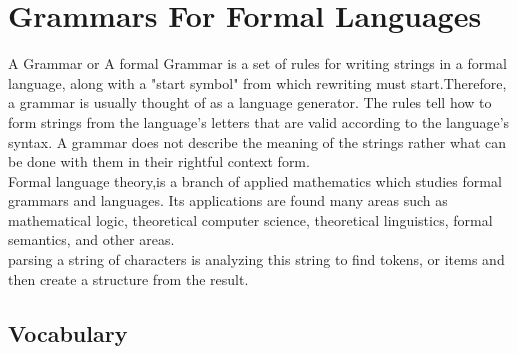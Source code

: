
\section{Grammars For Formal Languages}

A Grammar or A formal Grammar is a set of rules for writing strings in a formal language, along with a "start symbol" from which rewriting must start.Therefore, a grammar is usually thought of as a language generator. The rules tell how to form strings from the language's letters that are valid according to the language's syntax. A grammar does not describe the meaning of the strings rather  what can be done with them in their rightful context form.\\


Formal language theory,is a branch of applied mathematics which studies formal grammars and languages. Its applications are found many areas such as mathematical logic, theoretical computer science, theoretical linguistics, formal semantics,  and other areas.\\


parsing a string of characters is analyzing this string to find tokens, or items and then create a structure from the result.

\subsection{Vocabulary}

